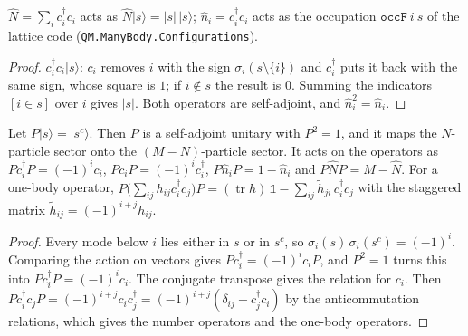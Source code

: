 \begin{theorem}\label{thm:number}
  \leanok
  $\hat N=\sum_i c_i^\dagger c_i$ acts as $\hat N|s\rangle=|s|\,|s\rangle$; $\hat n_i=c_i^\dagger c_i$ acts as the occupation
  $\mathtt{occF}\ i\ s$ of the lattice code (\texttt{QM.ManyBody.Configurations}).
\end{theorem}
\begin{proof}\leanok
  $c_i^\dagger c_i|s\rangle$: $c_i$ removes $i$ with the sign $\sigma_i(s\setminus\{i\})$ and $c_i^\dagger$ puts it back with the
  same sign, whose square is $1$; if $i\notin s$ the result is $0$. Summing the indicators $[i\in s]$ over $i$ gives $|s|$.
  Both operators are self-adjoint, and $\hat n_i^2=\hat n_i$.
\end{proof}

\begin{theorem}\label{thm:particle-hole}
  \leanok
  Let $P|s\rangle=|s^c\rangle$. Then $P$ is a self-adjoint unitary with $P^2=1$, and it maps the $N$-particle sector onto
  the $(M-N)$-particle sector. It acts on the operators as
  $Pc_i^\dagger P=(-1)^i c_i$, $Pc_iP=(-1)^i c_i^\dagger$, $P\hat n_iP=1-\hat n_i$ and $P\hat NP=M-\hat N$. For a one-body
  operator, $P\big(\sum_{ij}h_{ij}c_i^\dagger c_j\big)P=(\operatorname{tr}h)\,\mathbb 1-\sum_{ij}\tilde h_{ji}\,c_i^\dagger c_j$
  with the staggered matrix $\tilde h_{ij}=(-1)^{i+j}h_{ij}$.
\end{theorem}
\begin{proof}\leanok
  Every mode below $i$ lies either in $s$ or in $s^c$, so $\sigma_i(s)\,\sigma_i(s^c)=(-1)^i$. Comparing the action on vectors
  gives $Pc_i^\dagger=(-1)^ic_iP$, and $P^2=1$ turns this into $Pc_i^\dagger P=(-1)^ic_i$. The conjugate transpose gives the
  relation for $c_i$. Then $Pc_i^\dagger c_jP=(-1)^{i+j}c_ic_j^\dagger=(-1)^{i+j}(\delta_{ij}-c_j^\dagger c_i)$ by the
  anticommutation relations, which gives the number operators and the one-body operators.
\end{proof}

